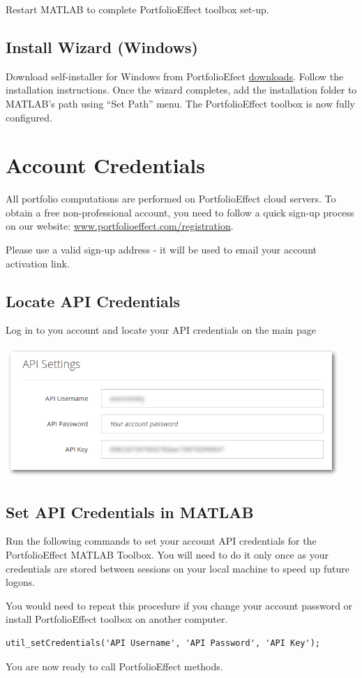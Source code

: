 \documentclass[letterpaper]{report}
\begin{document}
Restart MATLAB to complete PortfolioEffect toolbox set-up.

\section{Install Wizard (Windows)}
Download self-installer for Windows from PortfolioEfect
\href{https://www.portfolioeffect.com/docs/platform/quant/downloads}{downloads}.
Follow the installation instructions. Once the wizard completes, add the
installation folder to MATLAB's path using ``Set Path'' menu. 
The PortfolioEffect toolbox is now fully configured.

\chapter{Account Credentials}
All portfolio computations are performed on PortfolioEffect cloud servers.
To obtain a free non-professional account, you need to follow a quick sign-up
process on our website:
\href{https://www.portfolioeffect.com/registration}{www.portfolioeffect.com/registration}.\par
Please use a valid sign-up address - it will be used to email your
account activation link.

\section{Locate API Credentials} 
Log in to you account and locate your API credentials on the main page

\includegraphics[width=5in,natwidth=768,natheight=300]{img/api-settings.png}
 
\section{Set API Credentials in MATLAB} 
Run the following commands to set your account API credentials for the
PortfolioEffect MATLAB Toolbox.
You will need to do it only once as your credentials are stored between sessions
on your local machine to speed up future logons. \par You would need to repeat
this procedure if you change your account password or install PortfolioEffect
toolbox on another computer.
\begin{lstlisting}
util_setCredentials('API Username', 'API Password', 'API Key');
\end{lstlisting}
You are now ready to call PortfolioEffect methods.
\end{document}
